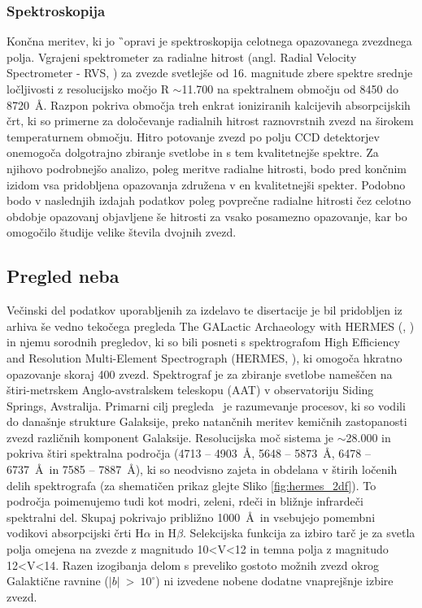 \subsubsection{Spektroskopija}
Končna meritev, ki jo \G\ opravi je spektroskopija celotnega opazovanega zvezdnega polja. Vgrajeni spektrometer za radialne hitrost (angl. Radial Velocity Spectrometer - RVS, \cite{2018A&A...616A...5C}) za zvezde svetlejše od 16. magnitude zbere spektre srednje ločljivosti z resolucijsko močjo R $\sim$11.700 na spektralnem območju od 8450 do 8720~\AA. Razpon pokriva območja treh enkrat ioniziranih kalcijevih absorpcijskih črt, ki so primerne za določevanje radialnih hitrost raznovrstnih zvezd na širokem temperaturnem območju. Hitro potovanje zvezd po polju CCD detektorjev onemogoča dolgotrajno zbiranje svetlobe in s tem kvalitetnejše spektre. Za njihovo podrobnejšo analizo, poleg meritve radialne hitrosti, bodo pred končnim izidom vsa pridobljena opazovanja združena v en kvalitetnejši spekter. Podobno bodo v naslednjih izdajah podatkov poleg povprečne radialne hitrosti čez celotno obdobje opazovanj objavljene še hitrosti za vsako posamezno opazovanje, kar bo omogočilo študije velike števila dvojnih zvezd.


\subsection{Pregled neba \Gh}
\label{sec:slo_galah}
Večinski del podatkov uporabljenih za izdelavo te disertacije je bil pridobljen iz arhiva še vedno tekočega pregleda The GALactic Archaeology with HERMES (\Gh, \cite{2015MNRAS.449.2604D}) in njemu sorodnih pregledov, ki so bili posneti s spektrografom High Efficiency and Resolution Multi-Element Spectrograph (HERMES, \cite{2010SPIE.7735E..09B, 2015JATIS...1c5002S}), ki omogoča hkratno opazovanje skoraj 400 zvezd. Spektrograf je za zbiranje svetlobe nameščen na štiri-metrskem Anglo-avstralskem teleskopu (AAT) v observatoriju Siding Springs, Avstralija. Primarni cilj pregleda \Gh\ je razumevanje procesov, ki so vodili do današnje strukture Galaksije, preko natančnih meritev kemičnih zastopanosti zvezd različnih komponent Galaksije. Resolucijska moč sistema je $\sim$28.000 in pokriva štiri spektralna področja (4713 -- 4903~\AA, 5648 -- 5873~\AA, 6478 -- 6737~\AA\ in 7585 -- 7887~\AA), ki so neodvisno zajeta in obdelana v štirih ločenih delih spektrografa (za shematičen prikaz glejte Sliko \ref{fig:hermes_2df}). To področja poimenujemo tudi kot modri, zeleni, rdeči in bližnje infrardeči spektralni del. Skupaj pokrivajo približno 1000~\AA\ in vsebujejo pomembni vodikovi absorpcijski črti H$\alpha$ in H$\beta$. Selekcijska funkcija za izbiro tarč je za svetla polja omejena na zvezde z magnitudo 10<V<12 in temna polja z magnitudo 12<V<14. Razen izogibanja delom s preveliko gostoto možnih zvezd okrog Galaktične ravnine ($|b|$~>~$10^\circ$) ni izvedene nobene dodatne vnaprejšnje izbire zvezd.

